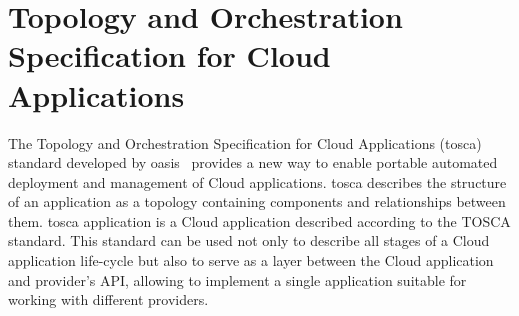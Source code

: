 \section{Topology and Orchestration Specification for Cloud	Applications} \label{sec:tosca}
The Topology and Orchestration Specification for Cloud Applications (\gls{tosca}) standard developed by \gls{oasis}~\cite{oasis} provides a new way to enable portable automated deployment and management of Cloud applications.
\gls{tosca} describes the structure of an application as a topology containing components and relationships between them.
\gls{tosca} application is a Cloud application described according to the TOSCA standard.
This standard can be used not only to describe all stages of a Cloud application life-cycle but also to serve as a layer between the Cloud application and provider's API, allowing to implement a single application suitable for working with different providers. 
